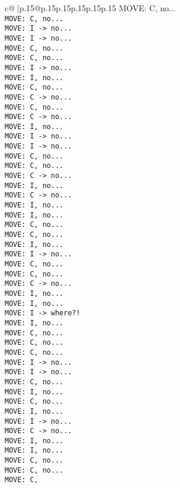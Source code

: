 \documentclass{article}
\begin{document}
{\begin{supertabular}{c@{$\;$}|p{.15\linewidth}@{}p{.15\linewidth}p{.15\linewidth}p{.15\linewidth}p{.15\linewidth}p{.15\linewidth}}
{{{MOVE: C, no...\\ \tt  MOVE: C, no...\\ \tt  MOVE: I -> no...\\ \tt  MOVE: I -> no...\\ \tt  MOVE: C, no...\\ \tt  MOVE: C, no...\\ \tt  MOVE: I -> no...\\ \tt  MOVE: I, no...\\ \tt  MOVE: C, no...\\ \tt  MOVE: C -> no...\\ \tt  MOVE: C, no...\\ \tt  MOVE: C -> no...\\ \tt  MOVE: I, no...\\ \tt  MOVE: I -> no...\\ \tt  MOVE: I -> no...\\ \tt  MOVE: C, no...\\ \tt  MOVE: C, no...\\ \tt  MOVE: C -> no...\\ \tt  MOVE: I, no...\\ \tt  MOVE: C -> no...\\ \tt  MOVE: I, no...\\ \tt  MOVE: I, no...\\ \tt  MOVE: C, no...\\ \tt  MOVE: C, no...\\ \tt  MOVE: I, no...\\ \tt  MOVE: I -> no...\\ \tt  MOVE: C, no...\\ \tt  MOVE: C, no...\\ \tt  MOVE: C -> no...\\ \tt  MOVE: I, no...\\ \tt  MOVE: I, no...\\ \tt  MOVE: I -> where?!\\ \tt  MOVE: I, no...\\ \tt  MOVE: C, no...\\ \tt  MOVE: C, no...\\ \tt  MOVE: C, no...\\ \tt  MOVE: I -> no...\\ \tt  MOVE: I -> no...\\ \tt  MOVE: C, no...\\ \tt  MOVE: I, no...\\ \tt  MOVE: C, no...\\ \tt  MOVE: I, no...\\ \tt  MOVE: I -> no...\\ \tt  MOVE: C -> no...\\ \tt  MOVE: I, no...\\ \tt  MOVE: I, no...\\ \tt  MOVE: C, no...\\ \tt  MOVE: C, no...\\ \tt  MOVE: C, }}}
\end{supertabular}}
\end{document}
